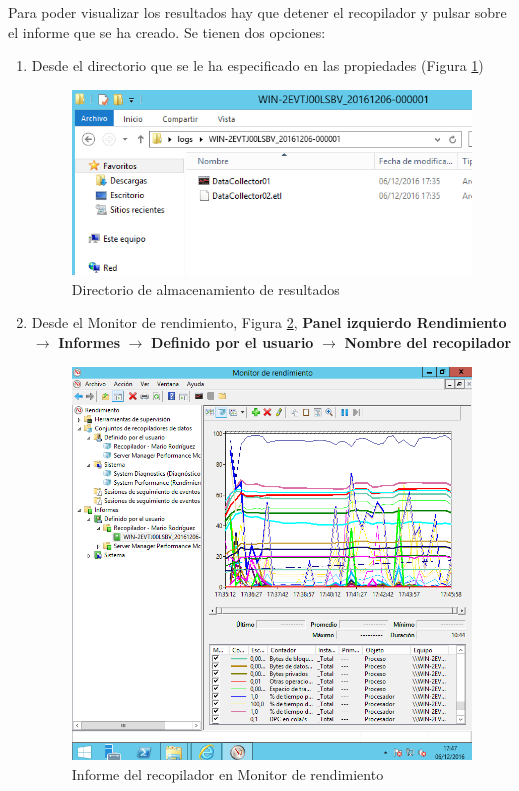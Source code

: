 	Para poder visualizar los resultados hay que detener el recopilador y pulsar sobre el informe que se ha creado. Se tienen dos opciones:
	
	\begin{enumerate}
		\item Desde el directorio que se le ha especificado en las propiedades (Figura \ref{fig:figura19})		
			\begin{figure}[H]
				\centering
				\includegraphics[scale=0.9]{figuras/figura19.png} 
				\caption{Directorio de almacenamiento de resultados} 
				\label{fig:figura19}
			\end{figure}
\newpage

		\item Desde el Monitor de rendimiento, Figura \ref{fig:figura21},
		\textbf{Panel izquierdo Rendimiento} $ \rightarrow $ \textbf{Informes} $ \rightarrow $ \textbf{Definido por el usuario} $ \rightarrow $ \textbf{Nombre del recopilador}
			\begin{figure}[H]
				\centering
				\includegraphics[scale=0.7]{figuras/figura21.png} 
				\caption{Informe del recopilador en Monitor de rendimiento} 
				\label{fig:figura21}
			\end{figure}
	\end{enumerate}	
	
